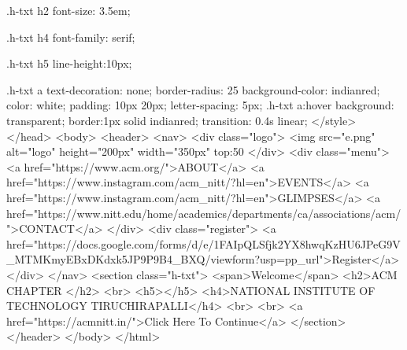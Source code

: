             .h-txt h2
            {
                font-size: 3.5em;
            }

            .h-txt h4{
                font-family: serif;
            }

            .h-txt h5
            {
                line-height:10px;
            }

            .h-txt a
            {
                text-decoration: none;
                border-radius: 25%
                background-color: indianred;
                color: white;
                padding: 10px 20px;
                letter-spacing: 5px;
            }
            .h-txt a:hover
            {
                background: transparent;
                border:1px solid indianred;
                transition: 0.4s linear;
            }
        </style>
    </head>
    <body>
        <header>
            <nav>
                <div class="logo">
                    <img src="e.png" alt="logo" height="200px" width="350px" top:50%
                </div>
                <div class="menu">
                    <a href="https://www.acm.org/">ABOUT</a>
                    <a href="https://www.instagram.com/acm_nitt/?hl=en">EVENTS</a>
                    <a href="https://www.instagram.com/acm_nitt/?hl=en">GLIMPSES</a>
                    <a href="https://www.nitt.edu/home/academics/departments/ca/associations/acm/">CONTACT</a>
                </div>
                <div class="register">
                    <a href="https://docs.google.com/forms/d/e/1FAIpQLSfjk2YX8hwqKzHU6JPeG9V_MTMKmyEBxDKdxk5JP9P9B4_BXQ/viewform?usp=pp_url">Register</a>
                </div>
            </nav>
            <section class="h-txt">
                <span>Welcome</span>
                <h2>ACM CHAPTER </h2>
                <br>
                <h5></h5>
                <h4>NATIONAL INSTITUTE OF TECHNOLOGY TIRUCHIRAPALLI</h4>
                <br>
                <br>
                <a href="https://acmnitt.in/">Click Here To Continue</a>
            </section>
        </header>
    </body>
</html>